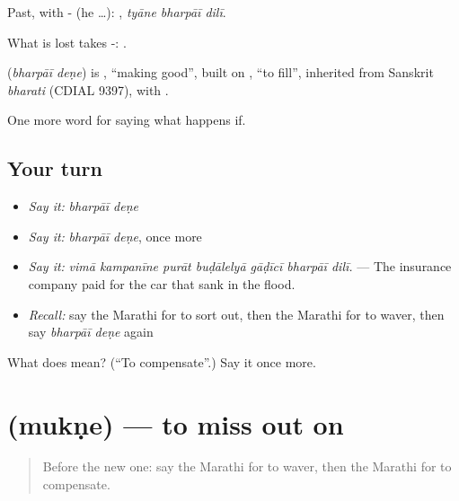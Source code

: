 Past, with - (he …):   , \emph{tyāne bharpāī dilī}.

What is lost takes -:   .

\begin{cousinweb}
\textbf{ } (\emph{bharpāī deṇe}) is , \textquotedblleft{}making good\textquotedblright{}, built on , \textquotedblleft{}to fill\textquotedblright{}, inherited from Sanskrit \emph{bharati} (CDIAL 9397), with .
\end{cousinweb}

\begin{grammarlens}[title={What you've built}]
One more word for saying what happens if.
\end{grammarlens}

\subsection*{Your turn}
\begin{itemize}
\raggedright
  \item \emph{Say it:} \emph{bharpāī deṇe}
  \item \emph{Say it:} \emph{bharpāī deṇe}, once more
  \item \emph{Say it:} \emph{vimā kampanīne purāt buḍālelyā gāḍīcī bharpāī dilī.} — The insurance company paid for the car that sank in the flood.
  \item \emph{Recall:} say the Marathi for to sort out, then the Marathi for to waver, then say \emph{bharpāī deṇe} again
\end{itemize}

\begin{tcolorbox}[breakable,colback=teal!4,colframe=teal!35!black,title={Before you move on}]
What does   mean? (\textquotedblleft{}To compensate\textquotedblright{}.) Say it once more.
\end{tcolorbox}
\section[\texorpdfstring{\mr{मुकणे} (mukṇe)}{मुकणे (mukṇe)}]{ (mukṇe) — to miss out on}

\label{lesson:MR-C549-mukne}



\begin{quote}
Before the new one: say the Marathi for to waver, then the Marathi for to compensate.
\end{quote}


